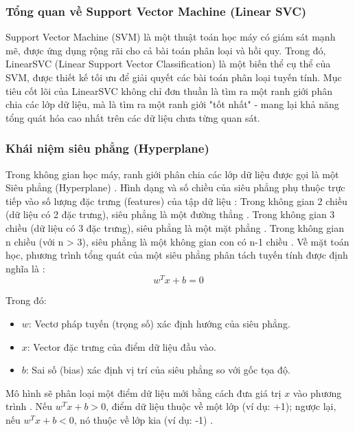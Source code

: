 \subsubsection{Tổng quan về Support Vector Machine (Linear SVC)}

Support Vector Machine (SVM) là một thuật toán học máy có giám sát mạnh mẽ, được ứng dụng rộng rãi cho cả bài toán phân loại và hồi quy. Trong đó, LinearSVC (Linear Support Vector Classification) là một biến thể cụ thể của SVM, được thiết kế tối ưu để giải quyết các bài toán phân loại tuyến tính. Mục tiêu cốt lõi của LinearSVC không chỉ đơn thuần là tìm ra một ranh giới phân chia các lớp dữ liệu, mà là tìm ra một ranh giới "tốt nhất" - mang lại khả năng tổng quát hóa cao nhất trên các dữ liệu chưa từng quan sát.

\subsubsection{Khái niệm siêu phẳng (Hyperplane)}

Trong không gian học máy, ranh giới phân chia các lớp dữ liệu được gọi là một Siêu phẳng (Hyperplane) \cite{hastie2009elements}. Hình dạng và số chiều của siêu phẳng phụ thuộc trực tiếp vào số lượng đặc trưng (features) của tập dữ liệu \cite{hastie2009elements}: Trong không gian 2 chiều (dữ liệu có 2 đặc trưng), siêu phẳng là một đường thẳng \cite{hastie2009elements}. Trong không gian 3 chiều (dữ liệu có 3 đặc trưng), siêu phẳng là một mặt phẳng \cite{hastie2009elements}. Trong không gian n chiều (với n > 3), siêu phẳng là một không gian con có n-1 chiều \cite{hastie2009elements}. Về mặt toán học, phương trình tổng quát của một siêu phẳng phân tách tuyến tính được định nghĩa là \cite{hastie2009elements}:
$$
w^T x + b = 0
$$

Trong đó:
\begin{itemize}
\item $w$: Vectơ pháp tuyến (trọng số) xác định hướng của siêu phẳng.

\item $x$: Vector đặc trưng của điểm dữ liệu đầu vào.

\item $b$: Sai số (bias) xác định vị trí của siêu phẳng so với gốc tọa độ.
\end{itemize}

Mô hình sẽ phân loại một điểm dữ liệu mới bằng cách đưa giá trị $x$ vào phương trình \cite{hastie2009elements}. Nếu $w^T x + b > 0$, điểm dữ liệu thuộc về một lớp (ví dụ: +1); ngược lại, nếu $w^T x + b < 0$, nó thuộc về lớp kia (ví dụ: -1) \cite{hastie2009elements}.

